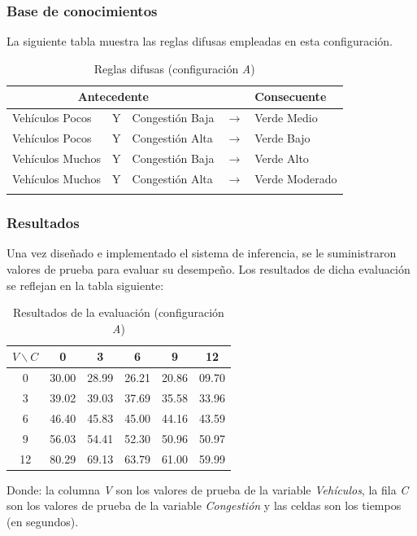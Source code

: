 \subsubsection{Base de conocimientos}
La siguiente tabla muestra las reglas difusas empleadas en esta configuración.\\
\begin{longtable}[c]{lclcl} \toprule
	\multicolumn{3}{c}{Antecedente} & & Consecuente \\ \midrule
	Vehículos Pocos & Y & Congestión Baja& $\rightarrow$ & Verde Medio \\
	Vehículos Pocos & Y & Congestión Alta& $\rightarrow$ & Verde Bajo \\
	Vehículos Muchos &Y& Congestión Baja& $\rightarrow$ & Verde Alto \\
	Vehículos Muchos &Y& Congestión Alta& $\rightarrow$ & Verde Moderado \\ \hline
	\caption{Reglas difusas (configuración \textit{A})}
\end{longtable}

\newpage
\subsubsection{Resultados}


Una vez diseñado e implementado el sistema de inferencia, se le suministraron valores de prueba para evaluar su desempeño. Los resultados de dicha evaluación se reflejan en la tabla siguiente:\\

\begin{table}[H]
	\centering
	\begin{tabular}{cccccc} \toprule
		$V \backslash C$ &  0 & 3 & 6 & 9 & 12 \\ \midrule
		0 & 30.00 & 28.99 & 26.21 & 20.86 & 09.70 \\
		3 & 39.02 & 39.03 & 37.69 & 35.58 & 33.96 \\
		6 & 46.40 & 45.83 & 45.00 & 44.16 & 43.59 \\
		9 & 56.03 & 54.41 & 52.30 & 50.96 & 50.97 \\
		12& 80.29 & 69.13 & 63.79 & 61.00 & 59.99 \\
	\end{tabular}
	\caption{Resultados de la evaluación (configuración \textit{A})}
\end{table}
Donde: la columna \textit{V} son los valores de prueba de la variable \textit{Vehículos}, la fila \textit{C} son los valores de  prueba de la variable \textit{Congestión} y las celdas son los tiempos (en segundos).\\




